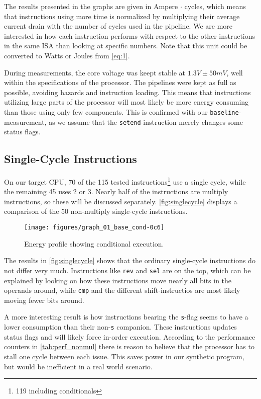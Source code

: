 The results presented in the graphs are given in Ampere $\cdot$ cycles, which
means that instructions using more time is normalized by multiplying their
average current drain with the number of cycles used in the pipeline. We are
more interested in how each instruction performs with respect to the other
instructions in the same ISA than looking at specific numbers. Note that this
unit could be converted to Watts or Joules from \autoref{eq:1}.

During measurements, the core voltage was keept stable at $1.3V\pm50mV$, well
within the specifications of the processor. The pipelines were kept as full as
possible, avoiding hazards and instruction loading. This means that instructions
utilizing large parts of the processor will most likely be more energy consuming
than those using only few components. This is confirmed with our
\texttt{baseline}-measurement, as we assume that the \texttt{setend}-instruction
merely changes some status flags.



\subsection{Single-Cycle Instructions}
On our target CPU, 70 of the 115 tested instructions\footnote{119 including
conditionals} use a single cycle, while the remaining 45 uses 2 or 3.
Nearly half of the instructions are multiply instructions, so these will be
discussed separately. \autoref{fig:singlecycle} displays a comparison of the 50 non-multiply
single-cycle instructions.

\begin{figure}
    \centering
    \texttt{[image: figures/graph\_01\_base\_cond-0c6]}
    \caption{Energy profile showing conditional execution.}
    \label{fig:cond}
\end{figure}

The results in \autoref{fig:singlecycle} shows that the ordinary single-cycle
instructions do not differ very much. Instructions like \texttt{rev} and
\texttt{sel} are on the top, which can be explained by looking on how these
instructions move nearly all bits in the operands around, while \texttt{cmp} and
the different shift-instructios are most likely moving fewer bits around.

A more interesting result is how instructions bearing the \texttt{s}-flag seems
to have a lower consumption than their non-\texttt{s} companion. These
instructions updates status flags and will likely force in-order execution.
According to the performance counters in \autoref{tab:perf_nonmul} there is
reason to believe that the processor has to stall one cycle between each issue.
This saves power in our synthetic program, but would be inefficient in a real
world scenario.

